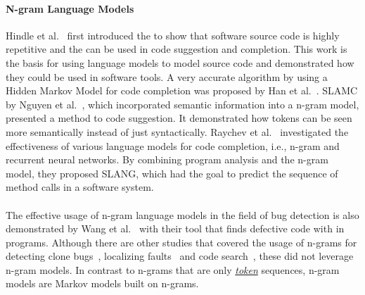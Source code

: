 \paragraph{N-gram Language Models}
Hindle et al.~\cite{naturalness} first introduced the \ngram{} to show that software source code is highly repetitive and the \ngram{} can be used in code suggestion and completion. This work is the basis for using language models to model source code and demonstrated how they could be used in software tools. A very accurate algorithm by using a Hidden Markov Model for code completion was proposed by Han et al.~\cite{codecompletion}. SLAMC by Nguyen et al.~\cite{SLAMC}, which incorporated semantic information into a n-gram model, presented a method to code suggestion. It demonstrated how tokens can be seen more semantically instead of just syntactically. Raychev et al.~\cite{SLANG} investigated the effectiveness of various language models for code completion, i.e., n-gram and recurrent neural networks. By combining program analysis and the n-gram model, they proposed SLANG, which had the goal to predict the sequence of method calls in a software system. 

\paragraph{\bugram{}}
The effective usage of n-gram language models in the field of bug detection is also demonstrated by Wang et al.~\cite{bugram} with their tool \bugram{} that finds defective code with  in \java{} programs. Although there are other studies that covered the usage of n-grams for detecting clone bugs~\cite{clonebugs}, localizing faults~\cite{faults} and code search~\cite{codesearch}, these did not leverage n-gram models. In contrast to n-grams that are only \hyperref[def:token]{\textit{token}} sequences, n-gram models are Markov models built on n-grams.